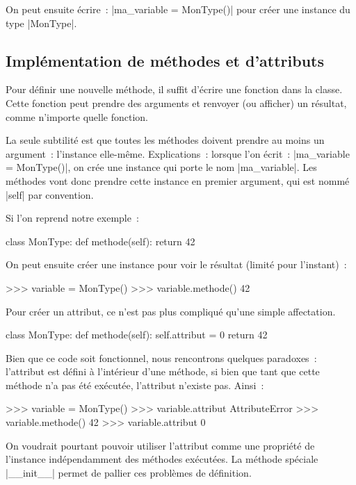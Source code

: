 		On peut ensuite écrire~: \python|ma_variable = MonType()| pour créer une instance du type \python|MonType|.
	
	\subsection{Implémentation de méthodes et d'attributs}
	
		Pour définir une nouvelle méthode, il suffit d'écrire une fonction dans la classe. Cette fonction peut prendre des arguments et renvoyer (ou afficher) un résultat, comme n'importe quelle fonction.
		
		La seule subtilité est que toutes les méthodes doivent prendre au moins un argument~: l'instance elle-même. Explications~: lorsque l'on écrit~: \python|ma_variable = MonType()|, on crée une instance qui porte le nom \python|ma_variable|. Les méthodes vont donc prendre cette instance en premier argument, qui est nommé \python|self| par convention.
		
		Si l'on reprend notre exemple~:
		\begin{pythoncode}
			class MonType:
				def methode(self):
					return 42
		\end{pythoncode}
		
		On peut ensuite créer une instance pour voir le résultat (limité pour l'instant)~:
		\begin{pythoncode}
			>>> variable = MonType()
			>>> variable.methode()
			42
		\end{pythoncode}
		
		Pour créer un attribut, ce n'est pas plus compliqué qu'une simple affectation.
		\begin{pythoncode}
			class MonType:
				def methode(self):
					self.attribut = 0
					return 42
		\end{pythoncode}
		
		Bien que ce code soit fonctionnel, nous rencontrons quelques paradoxes~: l'attribut est défini à l'intérieur d'une méthode, si bien que tant que cette méthode n'a pas été exécutée, l'attribut n'existe pas. Ainsi~:
		\begin{pythoncode}
			>>> variable = MonType()
			>>> variable.attribut
			AttributeError
			>>> variable.methode()
			42
			>>> variable.attribut
			0
		\end{pythoncode}
		
		On voudrait pourtant pouvoir utiliser l'attribut comme une propriété de l'instance indépendamment des méthodes exécutées. La méthode spéciale \python|__init__| permet de pallier ces problèmes de définition.
	
